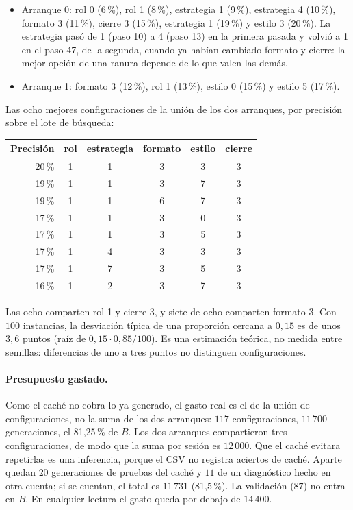 \begin{itemize}
  \item Arranque 0: rol 0 (6\,\%), rol 1 (8\,\%), estrategia 1 (9\,\%), estrategia 4
  (10\,\%), formato 3 (11\,\%), cierre 3 (15\,\%), estrategia 1 (19\,\%) y estilo 3
  (20\,\%). La estrategia pasó de 1 (paso 10) a 4 (paso 13) en la primera pasada y volvió
  a 1 en el paso 47, de la segunda, cuando ya habían cambiado formato y cierre: la mejor
  opción de una ranura depende de lo que valen las demás.
  \item Arranque 1: formato 3 (12\,\%), rol 1 (13\,\%), estilo 0 (15\,\%) y estilo 5
  (17\,\%).
\end{itemize}

Las ocho mejores configuraciones de la unión de los dos arranques, por precisión sobre el
lote de búsqueda:

\begin{center}
\begin{tabular}{rccccc}
\toprule
Precisión & rol & estrategia & formato & estilo & cierre \\
\midrule
20\,\% & 1 & 1 & 3 & 3 & 3 \\
19\,\% & 1 & 1 & 3 & 7 & 3 \\
19\,\% & 1 & 1 & 6 & 7 & 3 \\
17\,\% & 1 & 1 & 3 & 0 & 3 \\
17\,\% & 1 & 1 & 3 & 5 & 3 \\
17\,\% & 1 & 4 & 3 & 3 & 3 \\
17\,\% & 1 & 7 & 3 & 5 & 3 \\
16\,\% & 1 & 2 & 3 & 7 & 3 \\
\bottomrule
\end{tabular}
\end{center}

Las ocho comparten rol 1 y cierre 3, y siete de ocho comparten formato 3. Con $100$
instancias, la desviación típica de una proporción cercana a $0{,}15$ es de unos $3{,}6$
puntos (raíz de $0{,}15\cdot0{,}85/100$). Es una estimación teórica, no medida entre
semillas: diferencias de uno a tres puntos no distinguen configuraciones.

\paragraph{Presupuesto gastado.} Como el caché no cobra lo ya generado, el gasto real es el
de la unión de configuraciones, no la suma de los dos arranques: $117$ configuraciones,
$11\,700$ generaciones, el 81{,}25\,\% de $B$. Los dos arranques compartieron tres
configuraciones, de modo que la suma por sesión es $12\,000$. Que el caché evitara repetirlas
es una inferencia, porque el CSV no registra aciertos de caché. Aparte quedan $20$
generaciones de pruebas del caché y $11$ de un diagnóstico hecho en otra cuenta; si se
cuentan, el total es $11\,731$ (81{,}5\,\%). La validación ($87$) no entra en $B$. En
cualquier lectura el gasto queda por debajo de $14\,400$.

